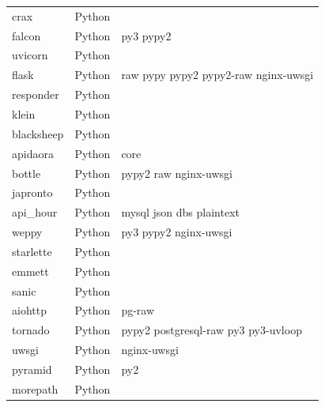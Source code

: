 \begin{longtable}{lll}
    crax             & Python      &                                                    \\
    falcon           & Python      & py3 pypy2                                          \\
    uvicorn          & Python      &                                                    \\
    flask            & Python      & raw pypy pypy2 pypy2-raw nginx-uwsgi               \\
    responder        & Python      &                                                    \\
    klein            & Python      &                                                    \\
    blacksheep       & Python      &                                                    \\
    apidaora         & Python      & core                                               \\
    bottle           & Python      & pypy2 raw nginx-uwsgi                              \\
    japronto         & Python      &                                                    \\
    api\_hour        & Python      & mysql json dbs plaintext                           \\
    weppy            & Python      & py3 pypy2 nginx-uwsgi                              \\
    starlette        & Python      &                                                    \\
    emmett           & Python      &                                                    \\
    sanic            & Python      &                                                    \\
    aiohttp          & Python      & pg-raw                                             \\
    tornado          & Python      & pypy2 postgresql-raw py3 py3-uvloop                \\
    uwsgi            & Python      & nginx-uwsgi                                        \\
    pyramid          & Python      & py2                                                \\
    morepath         & Python      &                                                    \\

\end{longtable}
